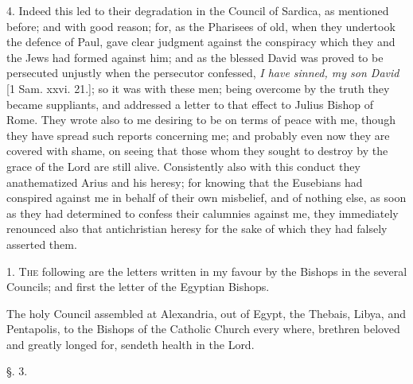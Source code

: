 4. Indeed this led to their degradation in the
Council of Sardica, as mentioned before; and with good reason; for, as
the Pharisees of old, when they undertook the defence of Paul, gave
clear judgment against the conspiracy which they and the Jews had
formed against him; and as the blessed David was proved to be
persecuted unjustly when the persecutor confessed, \emph{I have
sinned, my son David} [1 Sam. xxvi. 21.]; so it was with these men;
being overcome by the truth they became suppliants, and addressed a
letter to that effect to Julius Bishop of Rome. They wrote also to me
desiring to be on terms of peace with me, though they have spread such
reports concerning me; and probably even now they are covered with
shame, on seeing that those whom they sought to destroy by the grace
of the Lord are still alive. Consistently also with this conduct they
anathematized Arius and his heresy; for knowing that the Eusebians had
conspired against me in behalf of their own misbelief, and of nothing
else, as soon as they had determined to confess their calumnies
against me, they immediately renounced also that antichristian heresy
for the sake of which they had falsely asserted them.


1. T\textsc{he} following are the
letters written in my favour by the Bishops in the several Councils;
and first the letter of the Egyptian Bishops.

The holy Council assembled at Alexandria, out of Egypt, the Thebais,
Libya, and Pentapolis, to the Bishops of the Catholic Church every
where, brethren beloved and greatly longed for, sendeth health in the
Lord.

§. 3.

